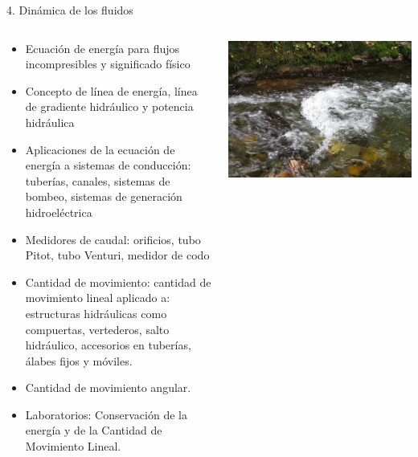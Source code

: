 \documentclass [xcolor=svgnames, t] {beamer}
\begin{document}
\begin{frame}{4. Din\'amica de los fluidos}
\vspace{-1.2cm}
\begin{columns}
\begin{exampleblock}{}
\begin{itemize}
\footnotesize
\item Ecuación de energía para flujos incompresibles y significado físico
\item Concepto de línea de energía, línea de gradiente hidráulico y potencia hidráulica
\item Aplicaciones de la ecuación de energía a sistemas de conducción: tuberías, canales, sistemas de bombeo, sistemas de generación hidroeléctrica
\item Medidores de caudal: orificios, tubo Pitot, tubo Venturi, medidor de codo
\item Cantidad de movimiento: cantidad de movimiento lineal aplicado a: estructuras hidráulicas como compuertas, vertederos, salto hidráulico, accesorios en tuberías, álabes fijos y móviles. 
\item Cantidad de movimiento angular.
\scriptsize
\item \alert{Laboratorios: Conservaci\'on de la energ\'ia y de la Cantidad de Movimiento Lineal.}
\end{itemize}
\end{exampleblock}
\begin{center}
\includegraphics[width=\textwidth]{fmd}

\end{center}
\end{columns}
\end{frame}
\end{document}
